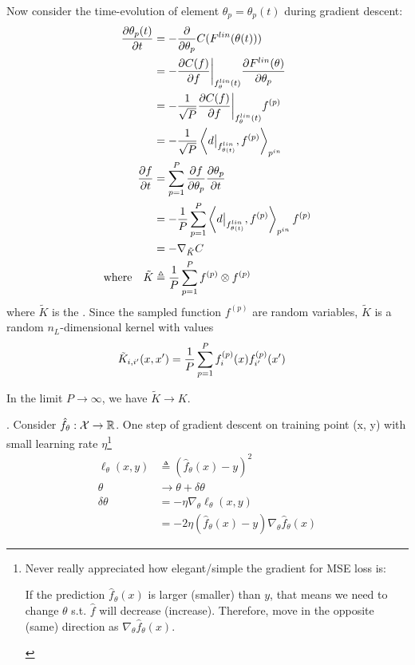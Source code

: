 \documentclass[11pt]{article}
\begin{document}
Now consider the time-evolution of element $\theta_p = \theta_p(t)$ during gradient descent: 
\begin{align}
		\frac{\partial \theta_p(t)}{\partial t}
	&= - \frac{\partial }{\partial \theta_p} C(F^{lin}(\theta(t))) \\
	&= - \frac{\partial C(f)}{\partial f}\bigg|_{f^{lin}_{\theta}(t)} \frac{\partial F^{lin}(\theta)}{\partial \theta_p} \\
	&= - \frac{1}{\sqrt{P}} \frac{\partial C(f)}{\partial f}\bigg|_{f^{lin}_{\theta}(t)}  f^{(p)}  \\
	&= - \frac{1}{\sqrt P} \left\langle   d\big|_{f_{\theta(t)}^{lin}}  ,  f^{(p)}  \right\rangle_{p^{in}} \\
	\frac{\partial f}{\partial t} 
		&= \sum_{p=1}^{P} \frac{\partial f}{\partial \theta_p} \frac{\partial \theta_p}{\partial t} \\
		&= - \frac{1}{P} \sum_{p=1}^{P}  \left\langle   d\big|_{f_{\theta(t)}^{lin}}  ,  f^{(p)}  \right\rangle_{p^{in}} f^{(p)} \\
		&= - \nabla_{\tilde K}{C} \\
	\text{where} \quad 
		\tilde K
			&\triangleq \frac{1}{P} \sum_{p=1}^{P} f^{(p)} \otimes f^{(p)}
\end{align}
where $\tilde K$ is the . Since the sampled function $f^{(p)}$ are random variables, $\tilde K$ is a random $n_L$-dimensional kernel with values
\begin{align}
	\tilde K_{i, i'}(x, x')
		&= \frac{1}{P} \sum_{p=1}^{P} f_i^{(p)}(x) f^{(p)}_{i'}(x')
\end{align}

In the limit $P \to \infty$, we have $\widetilde K \to K$. 










. Consider $\hat f_{\theta}: \mathcal X \to \mathbb{R}$. One step of gradient descent on training point (x, y) with small learning rate $\eta$\footnote{Never really appreciated how elegant/simple the gradient for MSE loss is: 
	\begin{myquote}[0.5em]
		If the prediction $\hat f_{\theta}(x)$ is larger (smaller) than $y$, that means we need to change $\theta$ s.t. $\hat f$ will decrease (increase). Therefore, move in the opposite (same) direction as $\nabla_{\theta} \hat f_{\theta}(x)$. 
	\end{myquote}}
\begin{align}
	\ell_{\theta}(x, y)
		&\triangleq (\hat f_{\theta}(x) - y)^2 \\
	\theta
		&\rightarrow \theta + \delta \theta \\
	\delta \theta 
		&= - \eta \nabla_{\theta} \ell_{\theta}(x, y) \\
		&= -2 \eta (\hat f_{\theta}(x) - y) \nabla_{\theta} \hat f_{\theta}(x)
\end{align}
\end{document}
